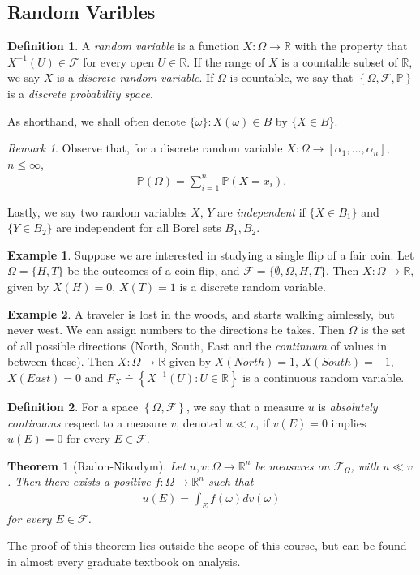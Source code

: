 \documentclass[12pt]{article}
\newcommand{\rr}{\mathbb{R}}
\newcommand{\filter}{\mathcal{F}}
\newcommand{\prob}{\mathbb{P}}
\theoremstyle{plain}
\newtheorem{theorem}{Theorem}
\theoremstyle{definition}
\newtheorem*{definition}{Definition}
\newtheorem*{example}{Example}
\theoremstyle{remark}
\newtheorem*{remark}{Remark}
\numberwithin{equation}{section}  %
\begin{document}
\subsection{Random Varibles} 
\begin{definition}
A \emph{random variable} is a function $X: \Omega \to \rr$ with the property
that $X^{-1}(U) \in \filter$ for every open $U \in \rr$. If the range of $X$
is a countable subset of $\rr$, we say $X$
is a \emph{discrete random variable}. If $\Omega$ is countable, we say that 
$\left\{ \Omega, \filter, \prob \right\}$ is a \emph{discrete probability space}.
\end{definition}
As shorthand, we shall often denote $\{\omega\}: X(\omega) \in B$ by
$\{X \in B$\}.
\begin{remark}
Observe that, for a discrete random variable $X: \Omega \to [\alpha_1,
\ldots, \alpha_n]$,  $n \le \infty$, 
\begin{align*}
\prob(\Omega) = \sum_{i =1}^n \prob(X = x_i).
\end{align*}
\end{remark}
Lastly, we say two random variables $X$, $Y$ are \emph{independent} if
$\{X \in B_1\}$ and $\{Y \in B_2\}$ are independent for all Borel sets
$B_1, B_2$. 
\begin{example}
Suppose we are interested in studying a single flip of a fair coin.
Let
$\Omega = \{H, T\}$ be the outcomes of a coin flip, and
$\filter = \{\emptyset, \Omega, H, T \}$. Then $X: \Omega \to \rr$, given by
$X(H) = 0$, $X(T) = 1$ is a discrete random variable.
\end{example}
\begin{example}
A traveler is lost in the woods, and starts walking aimlessly, but never
west. 
We can assign numbers to the directions he takes. 
Then $\Omega$ is the set of all possible directions (North, South, East
and the \emph{continuum} of values in between these). Then
$X: \Omega \to \rr$ given by $X(North) = 1$, $X(South) = -1$, $X(East) = 0$
and $F_{X} \doteq \left\{ X^{-1}(U): U \in \rr \right\}$ is a continuous random
variable.
\end{example}
\begin{definition}
For a space $\left\{ \Omega, \filter \right\}$, we say that a measure $u$ is
\emph{absolutely continuous} respect to a measure $v$, denoted $u \ll v$, if
$v(E) = 0$ implies $u(E) = 0$ for every $E \in \filter$.
\end{definition}
\begin{theorem}[Radon-Nikodym]
Let $u,v: \Omega \to \rr^n$ be measures on $\filter_{\Omega}$, with $u \ll v$.
Then there exists a positive $f: \Omega \to \rr^n$ such that
\begin{align*}
u(E) = \int_{E} f(\omega) dv(\omega)
\end{align*}
for every $E \in \filter$.
\end{theorem}
The proof of this theorem lies outside the scope of this course, but can be
found in almost every graduate textbook on analysis. 
\end{document}
